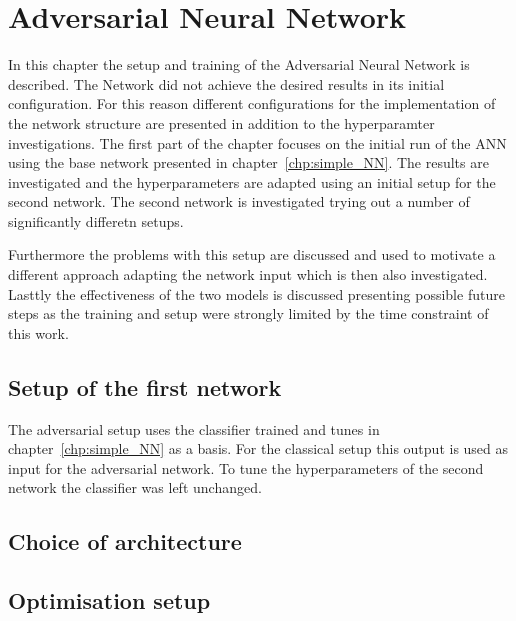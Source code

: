 \chapter{Adversarial Neural Network}
\label{chp:ANN}

In this chapter the setup and training of the Adversarial Neural Network is described. The Network did not achieve the desired results in its initial configuration.
For this reason different configurations for the implementation of the network structure are presented in addition to the hyperparamter investigations.
The first part of the chapter focuses on the initial run of the ANN using the base network presented in chapter~\ref{chp:simple_NN}. The results are investigated and the hyperparameters are adapted using an initial setup for the second network.
The second network is investigated trying out a number of significantly differetn setups.

Furthermore the problems with this setup are discussed and used to motivate a different approach adapting the network input which is then also investigated.
Lasttly the effectiveness of the two models is discussed presenting possible future steps as the training and setup were strongly limited by the time constraint of this work.
\section{Setup of the first network}

The adversarial setup uses the classifier trained and tunes in chapter~\ref{chp:simple_NN} as a basis. For the classical setup this output is used as input for the adversarial network.
To tune the hyperparameters of the second network the classifier was left unchanged. 

\section{Choice of architecture}

\section{Optimisation setup}

\section{}
